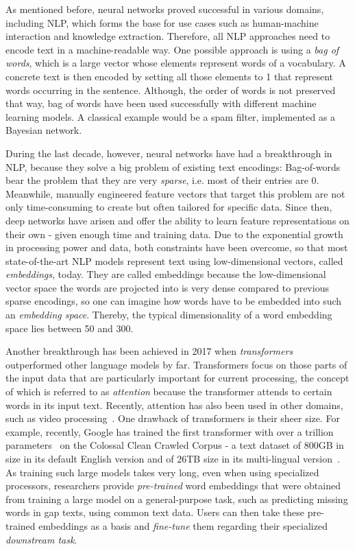 As mentioned before, neural networks proved successful in various domains, including NLP, which forms the base for use cases such as human-machine interaction and knowledge extraction. Therefore, all NLP approaches need to encode text in a machine-readable way. One possible approach is using a \emph{bag of words}, which is a large vector whose elements represent words of a vocabulary. A concrete text is then encoded by setting all those elements to 1 that represent words occurring in the sentence. Although, the order of words is not preserved that way, bag of words have been used successfully with different machine learning models. A classical example would be a spam filter, implemented as a Bayesian network.

During the last decade, however, neural networks have had a breakthrough in NLP, because they solve a big problem of existing text encodings: Bag-of-words bear the problem that they are very \emph{sparse}, i.e. most of their entries are 0. Meanwhile, manually engineered feature vectors that target this problem are not only time-consuming to create but often tailored for specific data. Since then, deep networks have arisen and offer the ability to learn feature representations on their own - given enough time and training data. Due to the exponential growth in processing power and data, both constraints have been overcome, so that most state-of-the-art NLP models represent text using low-dimensional vectors, called \emph{embeddings}, today. They are called embeddings because the low-dimensional vector space the words are projected into is very dense compared to previous sparse encodings, so one can imagine how words have to be embedded into such an \emph{embedding space}. Thereby, the typical dimensionality of a word embedding space lies between 50 and 300.

Another breakthrough has been achieved in 2017 when \emph{transformers} outperformed other language models by far. Transformers focus on those parts of the input data that are particularly important for current processing, the concept of which is referred to as \emph{attention} because the transformer attends to certain words in its input text. Recently, attention has also been used in other domains, such as video processing~\cite{Bertasius2021IsSA}. One drawback of transformers is their sheer size. For example, recently, Google has trained the first transformer with over a trillion parameters~\cite{Fedus2021SwitchTS} on the Colossal Clean Crawled Corpus - a text dataset of 800GB in size in its default English version and of 26TB size in its multi-lingual version~\cite{C4}. As training such large models takes very long, even when using specialized processors, researchers provide \emph{pre-trained} word embeddings that were obtained from training a large model on a general-purpose task, such as predicting missing words in gap texts, using common text data. Users can then take these pre-trained embeddings as a basis and \emph{fine-tune} them regarding their specialized \emph{downstream task}.
